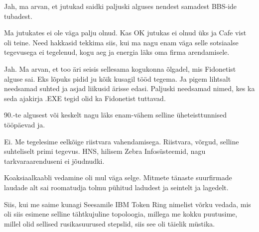 
Jah, ma arvan, et  jutukad saidki paljuski alguses nendest samadest BBS-ide tubadest.


Ma jutukates ei ole väga palju olnud. Kas OK jutukas ei olnud üks ja Cafe vist oli teine. Need hakkasid tekkima siis, kui ma nagu enam väga selle sotsiaalse tegevusega ei tegelenud, kogu aeg ja energia läks oma firma arendamisele.
                 

Jah. Ma arvan, et too äri seisis sellesama kogukonna õlgadel, mis Fidonetist  alguse sai. Eks lõpuks pidid ju kõik kusagil tööd tegema. Ja pigem lihtsalt needsamad suhted ja asjad liikusid ärisse edasi. Paljuski needsamad nimed, kes ka seda ajakirja .EXE tegid olid ka Fidonetist tuttavad. 


90.-te algusest või keskelt nagu läks enam-vähem selline üheteisttunnised tööpäevad ja. 


Ei. Me tegelesime eelkõige riistvara vahendamisega. Riistvara, võrgud, selline suhteliselt primi tegevus. HNS,  hilisem Zebra Infosüsteemid, nagu tarkvaraarenduseni ei jõudnudki.


Koaksiaalkaabli vedamine oli mul väga selge. Mitmete tänaste suurfirmade laudade alt sai roomatudja tolmu pühitud ladudest ja seintelt ja lagedelt.


Siis, kui me saime kunagi Seesamile IBM Token Ring nimelist võrku vedada, mis oli siis
 esimene selline tähtkujuline topoloogia, millega me kokku puutusime, millel olid sellised rusikasuurused stepslid, siis see oli täielik müstika.
 

